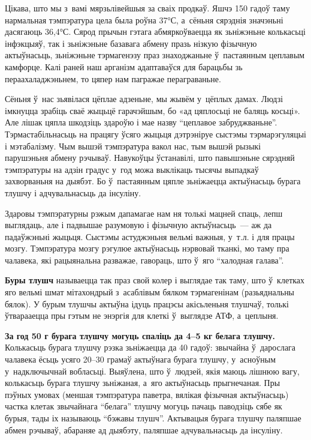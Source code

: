 Цікава, што мы з~вамі мярзьлівейшыя за сваіх продкаў. Яшчэ 150 гадоў таму нармальная тэмпэратура цела была роўна 37°С, а~сёньня сярэднія значэньні дасягаюць 36,4°С. Сярод прычын гэтага абмяркоўваецца як зьніжэньне колькасьці інфэкцыяў, так і зьніжэньне базавага абмену празь нізкую фізычную актыўнасьць, зьніжэньне тэрмагенэзу праз знаходжаньне ў~пастаянным цеплавым камфорце. Калі раней наш арганізм адаптаваўся для барацьбы зь пераахаладжэньнем, то цяпер нам пагражае пераграваньне.

Сёньня ў~нас зьявілася цёплае адзеньне, мы жывём у~цёплых дамах. Людзі імкнуцца зрабіць сваё жыцьцё гарачэйшым, бо «ад цяплосьці не баляць косьці». Але лішак цяпла шкодзіць здароўю і мае назву ``цеплавое забруджваньне''. Тэрмастабільнасьць на працягу ўсяго жыцьця дэтрэніруе сыстэмы тэрмарэгуляцыі і мэтабалізму. Чым вышэй тэмпэратура вакол нас, тым вышэй рызыкі парушэньня абмену рэчываў. Навукоўцы ўстанавілі, што павышэньне сярэдняй тэмпэратуры на адзін градус у~год можа выклікаць тысячы выпадкаў захворваньня на дыябэт. Бо ў~пастаянным цяпле зьніжаецца актыўнасьць бурага тлушчу і адчувальнасьць да інсуліну.

Здаровы тэмпэратурны рэжым дапамагае нам ня толькі мацней спаць, лепш выглядаць, але і падвышае разумовую і фізычную актыўнасьць~--- аж да падаўжэньні жыцьця. Сыстэмы астуджэньня вельмі важныя, у~т.л. і для працы мозгу. Тэмпэратура мозгу рэгулюе актыўнасьць нэрвовай тканкі, мо таму пра чалавека, які рацыянальна разважае, гавораць, што ў~яго ``халодная галава''.

\textbf{Буры тлушч} называецца так праз свой колер і выглядае так таму, што ў~клетках яго вельмі шмат мітахондрый з~асаблівым бялком тэрмагенінам (разьяднальны бялок). У бурым тлушчы актыўна ідуць працэсы акісьленьня тлушчаў, толькі ўтварааецца пры гэтым не энэргія для клеткі ў~выглядзе АТФ, а~цеплыня.

\textbf{За год 50 г бурага тлушчу могуць спаліць да 4--5 кг белага тлушчу.} Колькасьць бурага тлушчу рэзка зьніжаецца да 40 гадоў: звычайна ў~дарослага чалавека ёсьць усяго 20--30 грамаў актыўнага бурага тлушчу, у~асноўным у~надключычнай вобласьці. Выяўлена, што ў~людзей, якія маюць лішнюю вагу, колькасьць бурага тлушчу зьніжаная, а~яго актыўнасьць прыгнечаная. Пры пэўных умовах (меншая тэмпэратура паветра, вялікая фізычная актыўнасьць) частка клетак звычайнага ``белага'' тлушчу могуць пачаць паводзіць сябе як бурыя, тады іх называюць ``бэжавы тлушч''. Актывацыя бурага тлушчу паляпшае абмен рэчываў, абараняе ад дыябэту, паляпшае адчувальнасьць да інсуліну.

